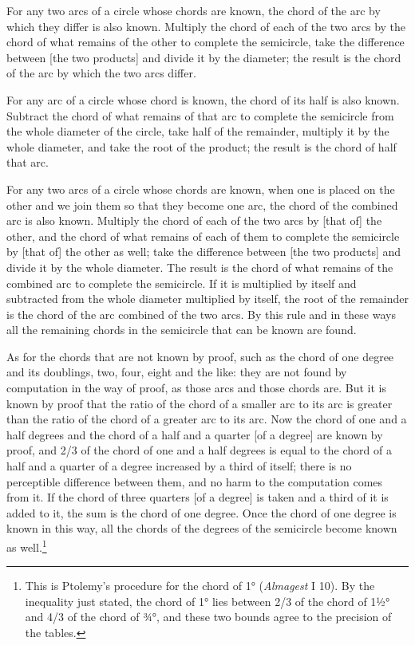 \documentclass[11pt]{article}
\begin{document}
\par For any two arcs of a circle whose chords are known, the chord of the arc by which they differ is also known. Multiply the chord of each of the two arcs by the chord of what remains of the other to complete the semicircle, take the difference between [the two products] and divide it by the diameter; the result is the chord of the arc by which the two arcs differ.\par
\par For any arc of a circle whose chord is known, the chord of its half is also known. Subtract the chord of what remains of that arc to complete the semicircle from the whole diameter of the circle, take half of the remainder, multiply it by the whole diameter, and take the root of the product; the result is the chord of half that arc.\par
\par For any two arcs of a circle whose chords are known, when one is placed on the other and we join them so that they become one arc, the chord of the combined arc is also known. Multiply the chord of each of the two arcs by [that of] the other, and the chord of what remains of each of them to complete the semicircle by [that of] the other as well; take the difference between [the two products] and divide it by the whole diameter. The result is the chord of what remains of the combined arc to complete the semicircle. If it is multiplied by itself and subtracted from the whole diameter multiplied by itself, the root of the remainder is the chord of the arc combined of the two arcs. By this rule and in these ways all the remaining chords in the semicircle that can be known are found.\par
\par As for the chords that are not known by proof, such as the chord of one degree and its doublings, two, four, eight and the like: they are not found by computation in the way of proof, as those arcs and those chords are. But it is known by proof that the ratio of the chord of a smaller arc to its arc is greater than the ratio of the chord of a greater arc to its arc. Now the chord of one and a half degrees and the chord of a half and a quarter [of a degree] are known by proof, and 2/3 of the chord of one and a half degrees is equal to the chord of a half and a quarter of a degree increased by a third of itself; there is no perceptible difference between them, and no harm to the computation comes from it. If the chord of three quarters [of a degree] is taken and a third of it is added to it, the sum is the chord of one degree. Once the chord of one degree is known in this way, all the chords of the degrees of the semicircle become known as well.\footnote{This is Ptolemy's procedure for the chord of 1° (\emph{Almagest} I 10). By the inequality just stated, the chord of 1° lies between 2/3 of the chord of 1½° and 4/3 of the chord of ¾°, and these two bounds agree to the precision of the tables.}\par
\end{document}
